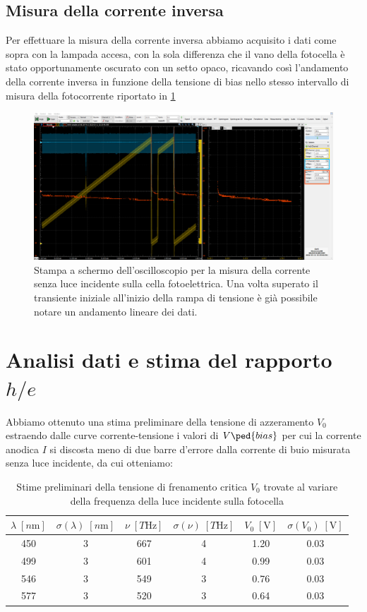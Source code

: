 \documentclass[10pt, a4paper, italian]{article}
\begin{document}
\subsection{Misura della corrente inversa}
Per effettuare la misura della corrente inversa abbiamo acquisito i dati come
sopra con la lampada accesa, con la sola differenza che il vano della
fotocella è stato opportunamente oscurato con un setto opaco, ricavando così
l'andamento della corrente inversa in funzione della tensione di bias nello
stesso intervallo di misura della fotocorrente riportato in \cref{fig: dark}
\begin{figure}[htbp]
    \centering
	\includegraphics[width=\textwidth]{dark}
    \caption{Stampa a schermo dell'oscilloscopio per la misura della corrente
    senza luce incidente sulla cella fotoelettrica. Una volta superato il
    transiente iniziale all'inizio della rampa di tensione è già possibile
    notare un andamento lineare dei dati.
    \label{fig: dark}}
\end{figure}

\section{Analisi dati e stima del rapporto $h/e$}
Abbiamo ottenuto una stima preliminare della tensione di azzeramento $V_0$
estraendo dalle curve corrente-tensione i valori di $V\ped{bias}$ per cui la
corrente anodica $I$ si discosta meno di due barre d'errore dalla corrente di
buio misurata senza luce incidente, da cui otteniamo:
\begin{table}
\centering
\begin{tabular}{cccccc}
\toprule
$\lambda \; [\si{n\m}]$ & $\sigma(\lambda) \; [\si{n\m}]$ &
$\nu \; [\si{T \Hz}]$ & $\sigma(\nu) \; [\si{T \Hz}]$ &
$V_0 \; [\si{\V}]$ & $\sigma(V_0) \; [\si{\V}]$ \\
\midrule
450 & 3 & 667 & 4 & 1.20 & 0.03 \\
499 & 3 & 601 & 4 & 0.99 & 0.03 \\
546 & 3 & 549 & 3 & 0.76 & 0.03 \\
577 & 3 & 520 & 3 & 0.64 & 0.03 \\
\bottomrule
\end{tabular}
\caption{Stime preliminari della tensione di frenamento critica $V_0$ trovate
al variare della frequenza della luce incidente sulla fotocella
\label{tab: V0prel}}
\end{table}
\end{document}
